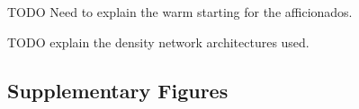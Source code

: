 \documentclass[11pt]{article}
\begin{document}
TODO Need to explain the warm starting for the afficionados.

TODO explain the density network architectures used.

\subsection{Supplementary Figures}


\end{document}
